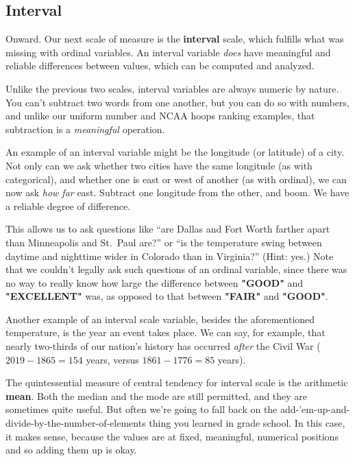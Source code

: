 \subsection{Interval}

Onward. Our next scale of measure is the \textbf{interval} scale, which
fulfills what was missing with ordinal variables. An interval variable
\textit{does} have meaningful and reliable differences between values, which
can be computed and analyzed.

Unlike the previous two scales, interval variables are always numeric by
nature. You can't subtract two words from one another, but you can do so with
numbers, and unlike our uniform number and NCAA hoops ranking examples, that
subtraction is a \textit{meaningful} operation.

An example of an interval variable might be the longitude (or latitude) of a
city. Not only can we ask whether two cities have the same longitude (as with
categorical), and whether one is east or west of another (as with ordinal), we
can now ask \textit{how far} east. Subtract one longitude from the other, and
boom. We have a reliable degree of difference.

This allows us to ask questions like ``are Dallas and Fort Worth farther apart
than Minneapolis and St.~Paul are?'' or ``is the temperature swing between
daytime and nighttime wider in Colorado than in Virginia?'' (Hint: yes.) Note
that we couldn't legally ask such questions of an ordinal variable, since there
was no way to really know how large the difference between \textbf{"GOOD"} and
\textbf{"EXCELLENT"} was, as opposed to that between \textbf{"FAIR"} and
\textbf{"GOOD"}.

Another example of an interval scale variable, besides the aforementioned
temperature, is the year an event takes place. We can say, for example, that
nearly two-thirds of our nation's history has occurred \textit{after} the Civil
War ($2019-1865=154$ years, versus $1861-1776=85$ years).

The quintessential measure of central tendency for interval scale is the
arithmetic \textbf{mean}. Both the median and the mode are still permitted, and
they are sometimes quite useful. But often we're going to fall back on the
add-'em-up-and-divide-by-the-number-of-elements thing you learned in grade
school. In this case, it makes sense, because the values are at fixed,
meaningful, numerical positions and so adding them up is okay.

